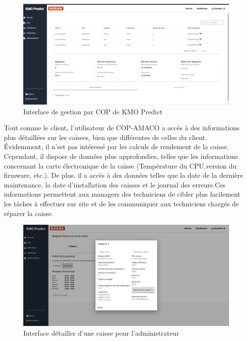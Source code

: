 \documentclass[12pt]{article}
\begin{document}
\centering
\begin{figure}[H]
    \centering
   \includegraphics[width=\textwidth]{img/interace_admin.png}
    \caption{Interface de gestion par COP  de KMO Predict}
    \label{fig:enter-label}
\end{figure}
 
 \justify
 \text Tout comme le client, l'utilisateur de COP-AMACO a accès à des informations plus détail\-lées sur les caisses, bien que différentes de celles du client. Évidemment, il n'est pas intéressé par les calculs de rendement de la caisse. Cependant, il dispose de données plus approfondies, telles que les informations concernant la carte électronique de la caisse (Température du CPU,version du firmware, etc.). De plus, il a accès à des données telles que la date de la dernière maintenance, la date d'installation des caisses et le journal des erreurs.Ces informations permettent aux managers des techniciens de cibler plus facilement les tâches à effectuer sur site et de les communiquer aux techniciens chargés de réparer la caisse.

\begin{figure}[H]
    \centering
    \includegraphics[width=\textwidth]{img/VIEW_cop_admin.png}
    \caption{Interface détailler d'une caisse pour l'administrateur}
    \label{fig:enter-label}
\end{figure}
\end{document}
